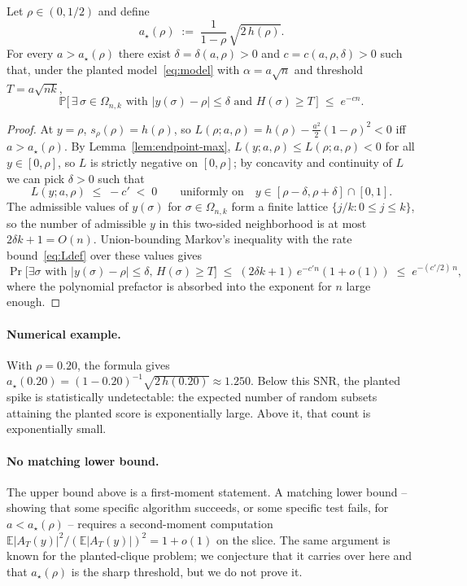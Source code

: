 \begin{theorem}\label{thm:detect}
Let $\rho\in(0,1/2)$ and define
\begin{equation}\label{eq:adetect}
a_\star(\rho) \;:=\; \frac{1}{1-\rho}\,\sqrt{2\,h(\rho)}.
\end{equation}
For every $a > a_\star(\rho)$ there exist $\delta=\delta(a,\rho)>0$ and
$c=c(a,\rho,\delta)>0$ such that, under the planted model~\eqref{eq:model} with
$\alpha=a\sqrt n$ and threshold $T=a\sqrt{nk}$,
\[
\mathbb P\bigl[\,\exists\,\sigma\in\Omega_{n,k}\text{ with } |y(\sigma)-\rho|\le \delta
\text{ and } H(\sigma)\ge T\,\bigr]\;\le\; e^{-c n}.
\]
\end{theorem}
\begin{proof}
At $y=\rho$, $s_\rho(\rho)=h(\rho)$, so $L(\rho;a,\rho)=h(\rho)-\tfrac{a^2}{2}(1-\rho)^2<0$
iff $a>a_\star(\rho)$. By Lemma~\ref{lem:endpoint-max}, $L(y;a,\rho)\le L(\rho;a,\rho)<0$
for all $y\in[0,\rho]$, so $L$ is strictly negative on $[0,\rho]$; by concavity and
continuity of $L$ we can pick $\delta>0$ such that
\[
L(y;a,\rho)\;\le\;-c'\;<\;0 \qquad \text{uniformly on}\quad
y\in[\rho-\delta,\rho+\delta]\cap[0,1].
\]
The admissible values of $y(\sigma)$ for $\sigma\in\Omega_{n,k}$ form a finite lattice
$\{j/k:0\le j\le k\}$, so the number of admissible $y$ in this two-sided neighborhood is
at most $2\delta k + 1 = O(n)$. Union-bounding Markov's inequality with the rate
bound~\eqref{eq:Ldef} over these values gives
\[
\Pr\!\bigl[\exists \sigma \text{ with } |y(\sigma)-\rho|\le\delta,\, H(\sigma)\ge T\bigr]
  \;\le\; (2\delta k+1)\,e^{-c' n}(1+o(1))
  \;\le\; e^{-(c'/2)\,n},
\]
where the polynomial prefactor is absorbed into the exponent for $n$ large enough.
\end{proof}

\paragraph{Numerical example.} With $\rho=0.20$, the formula gives
$a_\star(0.20)=(1-0.20)^{-1}\sqrt{2\,h(0.20)}\approx 1.250$. Below this SNR, the
planted spike is statistically undetectable: the expected number of random subsets
attaining the planted score is exponentially large. Above it, that count is
exponentially small.

\paragraph{No matching lower bound.} The upper bound above is a first-moment statement.
A matching lower bound -- showing that some specific algorithm succeeds, or some
specific test fails, for $a<a_\star(\rho)$ -- requires a second-moment computation
$\mathbb E|A_T(y)|^2/(\mathbb E|A_T(y)|)^2 = 1+o(1)$ on the slice. The same argument
is known for the planted-clique problem; we
conjecture that it carries over here and that $a_\star(\rho)$ is the sharp threshold,
but we do not prove it.

